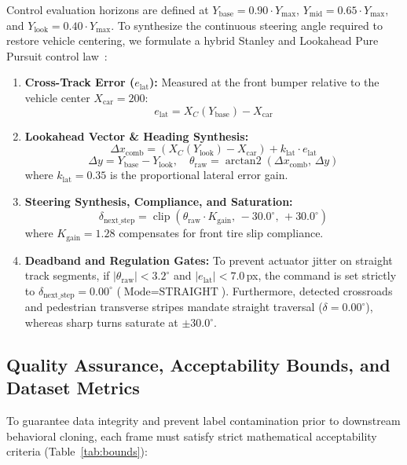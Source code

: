 \documentclass[10pt,journal,compsoc]{IEEEtran}
\begin{document}
Control evaluation horizons are defined at $Y_{\text{base}} = 0.90 \cdot Y_{\max}$, $Y_{\text{mid}} = 0.65 \cdot Y_{\max}$, and $Y_{\text{look}} = 0.40 \cdot Y_{\max}$. To synthesize the continuous steering angle required to restore vehicle centering, we formulate a hybrid Stanley and Lookahead Pure Pursuit control law~\cite{hoffmann2007autonomous,coulter1992implementation}:
\begin{enumerate}
    \item \textbf{Cross-Track Error ($e_{\text{lat}}$):} Measured at the front bumper relative to the vehicle center $X_{\text{car}} = 200$:
    \begin{equation}
    e_{\text{lat}} = X_C(Y_{\text{base}}) - X_{\text{car}}
    \end{equation}
    \item \textbf{Lookahead Vector \& Heading Synthesis:}
    \begin{equation}
    \Delta x_{\text{comb}} = (X_C(Y_{\text{look}}) - X_{\text{car}}) + k_{\text{lat}} \cdot e_{\text{lat}}
    \end{equation}
    \begin{equation}
    \Delta y = Y_{\text{base}} - Y_{\text{look}}, \quad \theta_{\text{raw}} = \operatorname{arctan2}(\Delta x_{\text{comb}}, \, \Delta y)
    \end{equation}
    where $k_{\text{lat}} = 0.35$ is the proportional lateral error gain.
    \item \textbf{Steering Synthesis, Compliance, and Saturation:}
    \begin{equation}
    \delta_{\text{next\_step}} = \operatorname{clip}\left(\theta_{\text{raw}} \cdot K_{\text{gain}}, \, -30.0^\circ, \, +30.0^\circ\right)
    \end{equation}
    where $K_{\text{gain}} = 1.28$ compensates for front tire slip compliance.
    \item \textbf{Deadband and Regulation Gates:}
    To prevent actuator jitter on straight track segments, if $|\theta_{\text{raw}}| < 3.2^\circ$ and $|e_{\text{lat}}| < 7.0$\,px, the command is set strictly to $\delta_{\text{next\_step}} = 0.00^\circ$ ($\text{Mode} = \text{STRAIGHT}$). Furthermore, detected crossroads and pedestrian transverse stripes mandate straight traversal ($\delta = 0.00^\circ$), whereas sharp turns saturate at $\pm 30.0^\circ$.
\end{enumerate}

\subsection{Quality Assurance, Acceptability Bounds, and Dataset Metrics}
\label{sec:quality_assurance}
To guarantee data integrity and prevent label contamination prior to downstream behavioral cloning, each frame must satisfy strict mathematical acceptability criteria (Table~\ref{tab:bounds}):
\end{document}

